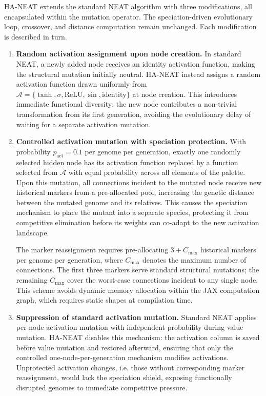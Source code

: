 \documentclass[12pt]{article}
\begin{document}
HA-NEAT extends the standard NEAT algorithm with three modifications, all encapsulated within the mutation operator. The speciation-driven evolutionary loop, crossover, and distance computation remain unchanged. Each modification is described in turn.

\begin{enumerate}
    \item \textbf{Random activation assignment upon node creation.} In standard NEAT, a newly added node receives an identity activation function, making the structural mutation initially neutral. HA-NEAT instead assigns a random activation function drawn uniformly from $\mathcal{A} = \{\tanh, \sigma, \text{ReLU}, \sin, \text{identity}\}$ at node creation. This introduces immediate functional diversity: the new node contributes a non-trivial transformation from its first generation, avoiding the evolutionary delay of waiting for a separate activation mutation.
    
    \item \textbf{Controlled activation mutation with speciation protection.} With probability $p_{\text{act}} = 0.1$ per genome per generation, exactly one randomly selected hidden node has its activation function replaced by a function selected from
    $\mathcal{A}$ with equal probability across all elements of the palette. Upon this mutation, all connections incident to the mutated node receive new historical markers from a pre-allocated pool, increasing the genetic distance between the mutated genome and its relatives. This causes the speciation mechanism to place the mutant into a separate species, protecting it from competitive elimination before its weights can co-adapt to the new activation landscape.
    
    The marker reassignment requires pre-allocating $3 + C_{\max}$ historical markers per genome per generation, where $C_{\max}$ denotes the maximum number of connections. The first three markers serve standard structural mutations; the remaining $C_{\max}$ cover the worst-case connections incident to any single node. This scheme avoids dynamic memory allocation within the JAX computation graph, which requires static shapes at compilation time.
    
    \item \textbf{Suppression of standard activation mutation.} Standard NEAT applies per-node activation mutation with independent probability during value mutation. HA-NEAT disables this mechanism: the activation column is saved before value mutation and restored afterward, ensuring that only the controlled one-node-per-generation mechanism modifies activations. Unprotected activation changes, i.e. those without corresponding marker reassignment, would lack the speciation shield, exposing functionally disrupted genomes to immediate competitive pressure.
\end{enumerate}
\end{document}
